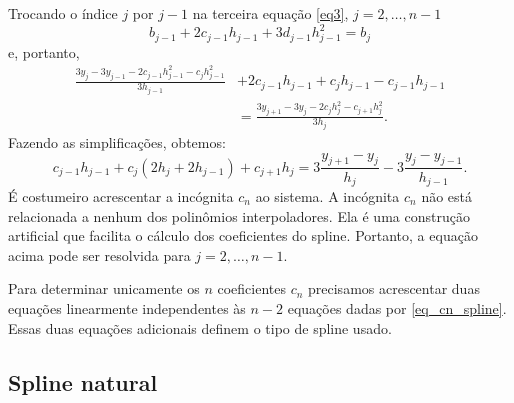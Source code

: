 Trocando o índice $j$ por $j-1$ na terceira equação \eqref{eq3}, $j=2,\ldots, n-1$
\begin{equation}
b_{j-1}+2c_{j-1}h_{j-1}+3d_{j-1}h_{j-1}^2=b_{j}  
\end{equation}
e, portanto,
\begin{equation}
  \begin{split}
    \frac{3y_{j}-3y_{j-1}-2c_{j-1}h_{j-1}^2-c_{j}h_{j-1}^2}{3h_{j-1}} &+ 2c_{j-1}h_{j-1}+c_{j}h_{j-1}-c_{j-1}h_{j-1} \\
    &=\frac{3y_{j+1}-3y_j-2c_jh_j^2-c_{j+1}h_j^2}{3h_j}.      
  \end{split}
\end{equation}
Fazendo as simplificações, obtemos:
\begin{equation}\label{eq_cn_spline}
  c_{j-1}h_{j-1}+c_j(2h_j+2h_{j-1})+c_{j+1}h_j=3\frac{y_{j+1}-y_j}{h_j}-3\frac{y_{j}-y_{j-1}}{h_{j-1}}.
\end{equation}
É costumeiro acrescentar a incógnita $c_n$ ao sistema. A incógnita $c_n$ não está relacionada a nenhum dos polinômios interpoladores. Ela é uma construção artificial que facilita o cálculo dos coeficientes do spline. Portanto, a equação acima pode ser resolvida para $j=2, \ldots, n-1$.

Para determinar unicamente os $n$ coeficientes $c_n$ precisamos acrescentar duas equações linearmente independentes às $n-2$ equações dadas por \eqref{eq_cn_spline}. Essas duas equações adicionais definem o tipo de spline usado.

\subsection{Spline natural}

